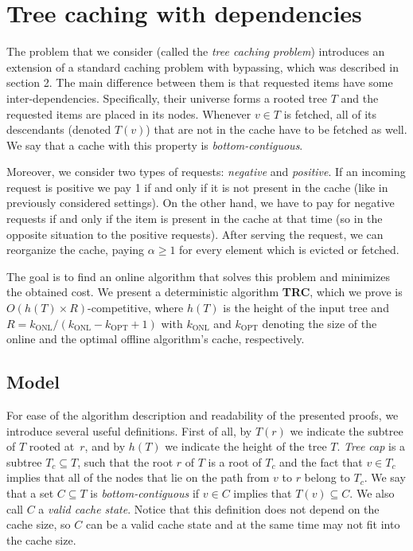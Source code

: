 \section{Tree caching with dependencies} \label{tree_caching_algo} The problem
that we consider (called the \textit{tree caching problem}) introduces an extension
of a standard caching problem with bypassing, which was described in section 2.
The main difference between them is that requested items have some
inter-dependencies. Specifically, their universe forms a rooted tree $T$ and the
requested items are placed in its nodes.  Whenever $v \in T$ is fetched, all of
its descendants (denoted $T(v)$) that are not in the cache have to be fetched 
as well. We say that a cache with this property is \textit{bottom-contiguous}.

Moreover, we consider two types of requests: \textit{negative} and
\textit{positive}. If an incoming request is positive we pay 1 if and only if it
is not present in the cache (like in previously considered settings). On the
other hand, we have to pay for negative requests if and only if the item is
present in the cache at that time (so in the opposite situation to the positive
requests). After serving the request, we can reorganize the cache, paying
$\alpha \geq 1$ for every element which is evicted or fetched. 

The goal is to find an online algorithm that solves this problem and minimizes
the obtained cost. We present a deterministic algorithm \textbf{TRC}, which we
prove is $O(h(T) \times R)$-competitive, where $h(T)$ is the height of the input tree
and $R = k_{\mathrm{ONL}}/(k_{\mathrm{ONL}} - k_{\mathrm{OPT}} +1)$ with
$k_{\mathrm{ONL}}$ and $k_{\mathrm{OPT}}$ denoting the size of the online and
the optimal offline algorithm's cache, respectively.

\subsection{Model}  For ease of the algorithm description
and readability of the presented proofs, we introduce several useful definitions.
First of all, by $T(r)$ we indicate the subtree of $T$ rooted at~$r$, and by
$h(T)$ we indicate the height of the tree $T$. \textit{Tree cap} is a subtree $T_c \subseteq
T$, such that the root $r$ of $T$ is a root of $T_c$ and the fact that $v \in T_c$
implies that all of the nodes that lie on the path from $v$ to $r$ belong to
$T_c$.  We say that a set $C \subseteq T$ is \textit{bottom-contiguous} if $v
\in C$ implies that $T(v) \subseteq C$. We also call $C$ a \textit{valid cache state}.
Notice that this definition does not depend on the cache size, so $C$ can be
a valid cache state and at the same time may not fit into the cache size.

